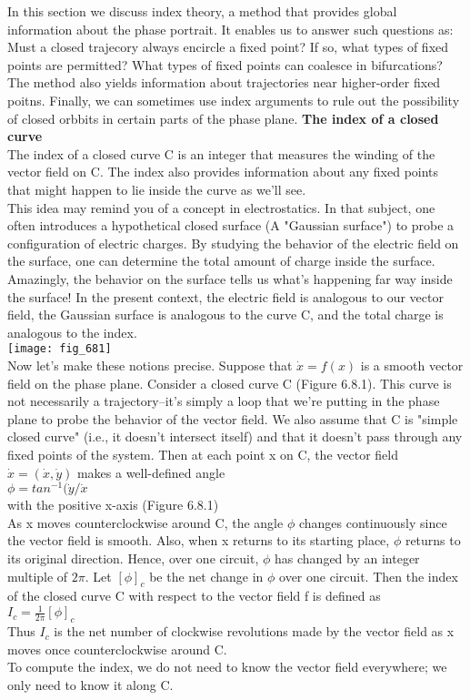 \documentclass{article}
\newcommand\tab[1][1cm]{\hspace*{#1}}
\begin{document}
In this section we discuss index theory, a method that provides global information about the phase portrait. It enables us to answer such questions as: Must a closed trajecory always encircle a fixed point? If so, what types of fixed points are permitted? What types of fixed points can coalesce in bifurcations? The method also yields information about trajectories near higher-order fixed poitns. Finally, we can sometimes use index arguments to rule out the possibility of closed orbbits in certain parts of the phase plane. 
\textbf {The index of a closed curve}
\\ \tab The index of a closed curve C is an integer that measures the winding of the vector field on C. The index also provides information about any fixed points that might happen to lie inside the curve as we'll see. \\ \tab
This idea may remind you of a concept in electrostatics. In that subject, one often introduces a hypothetical closed surface (A "Gaussian surface") to probe a configuration of electric charges. By studying the behavior of the electric field on the surface, one can determine the total amount of charge inside the surface. Amazingly, the behavior on the surface tells us what's happening far way inside the surface! In the present context, the electric field is analogous to our vector field, the Gaussian surface is analogous to the curve C, and the total charge is analogous to the index. \\ 
\texttt{[image: fig\_681]} \\ \tab
Now let's make these notions precise. Suppose that $\dot{x}=f(x)$ is a smooth vector field on the phase plane. Consider a closed curve C (Figure 6.8.1). This curve is not necessarily a trajectory--it's simply a loop that we're putting in the phase plane to probe the behavior of the vector field. We also assume that C is "simple closed curve" (i.e., it doesn't intersect itself) and that it doesn't pass through any fixed points of the system. Then at each point x on C, the vector field $\dot{x}=(\dot{x},\dot{y})$ makes a well-defined angle 
\\ \tab $\phi = tan^{-1}(\dot{y}/\dot{x}$ \\
with the positive x-axis (Figure 6.8.1) \\ 
\tab As x moves counterclockwise around C, the angle $\phi$ changes continuously since the vector field is smooth. Also, when x returns to its starting place, $\phi$ returns to its original direction. Hence, over one circuit, $\phi$ has changed by an integer multiple of $2\pi$. Let $[\phi]_{c}$ be the net change in $\phi$ over one circuit. Then the index of the closed curve C with respect to the vector field f is defined as \\ \tab
$I_{c}=\frac{1}{2\pi}[\phi]_{c}$ \\ 
Thus $I_{c}$ is the net number of clockwise revolutions made by the vector field as x moves once counterclockwise around C. \\
\tab To compute the index, we do not need to know the vector field everywhere; we only need to know it along C.
\end{document}
